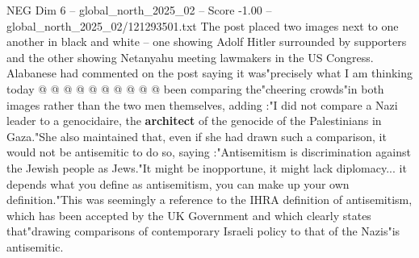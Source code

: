 \begin{textsample}{NEG Dim 6 – global\_north\_2025\_02 – Score -1.00 – global\_north\_2025\_02/121293501.txt}
The post placed two images next to one another in black and white -- one showing Adolf Hitler surrounded by supporters and the other showing Netanyahu meeting lawmakers in the US Congress.
Alabanese had commented on the post saying it was"precisely what I am thinking today @ @ @ @ @ @ @ @ @ @ been comparing the"cheering crowds"in both images rather than the two men themselves, adding :"I did not compare a Nazi leader to a genocidaire, the \textbf{architect} of the genocide of the Palestinians in Gaza."She also maintained that, even if she had drawn such a comparison, it would not be antisemitic to do so, saying :"Antisemitism is discrimination against the Jewish people as Jews."It might be inopportune, it might lack diplomacy... it depends what you define as antisemitism, you can make up your own definition."This was seemingly a reference to the IHRA definition of antisemitism, which has been accepted by the UK Government and which clearly states that"drawing comparisons of contemporary Israeli policy to that of the Nazis"is antisemitic.

\end{textsample}
